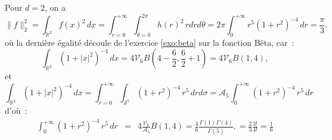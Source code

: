 {\begin{enumerate}
{Pour $d = 2$, on a
$$
\|f\|_{2}^2 = \int_{\mathbb{R}^2} f(x)^2\,dx =
\int_{r=0}^{+\infty}\int_{\theta=0}^{2\pi} h(r)^2 \,r dr d\theta =
2\pi \int_{0}^{+\infty} r^5 (1+r^2)^{-4}\,dr = \frac{\pi}{3},
$$
o\`u la derni\`ere \'egalit\'e d\'ecoule de l'exercice \ref{exo:beta} sur la fonction Bêta, car~:
$$
\int_{\mathbb{R}^2} (1 + |x|^2)^{-4}\,dx = 4\mathcal{V}_{6}
B\left(4 - \frac{6}{2}, \frac{6}{2} + 1\right) = 4 \mathcal{V}_{6}
B\left(1, 4\right),
$$
et
$$
\int_{\mathbb{R}^2} (1 + |x|^2)^{-4}\,dx = \int_{r =
0}^{+\infty}\int_{\mathcal{S}^5} (1 + r^{2})^{-4}\, r^5 \,dr
d\sigma = \mathcal{A}_{5} \int_{0}^{+\infty} (1 + r^{2})^{-4}\,
r^5 \,dr
$$
d'o\`u~:
$$
\begin{array}{lcl}
\int_{0}^{+\infty} (1 + r^{2})^{-4}\, r^5 \,dr  & =&  4
\frac{\mathcal{V}_{6}}{\mathcal{A}_5} B\left(1, 4\right) =
\frac{4}{6} \frac{\Gamma(1)\Gamma(4)}{\Gamma(5)},
 =
\frac{2}{3}\frac{3!}{4!} = \frac{1}{6}
\end{array}
$$}
\end{enumerate}
}
